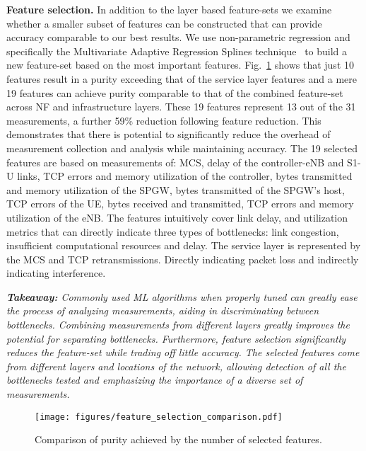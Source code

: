 \documentclass[journal,comsoc]{IEEEtran}
\begin{document}
% 
\textbf{Feature selection.}
In addition to the layer based feature-sets we examine whether a smaller subset of features can be constructed that can provide accuracy comparable to our best results.
We use non-parametric regression and specifically the Multivariate Adaptive Regression Splines technique~\cite{friedman1991multivariate} to build a new feature-set based on the most important features.
Fig.~\ref{fig:selection} shows that just 10 features result in a purity exceeding that of the service layer features and a mere 19 features can achieve purity comparable to that of the combined feature-set across NF and infrastructure layers.
These 19 features represent 13 out of the 31 measurements, a further 59\% reduction following feature reduction. 
This demonstrates that there is potential to significantly reduce the overhead of measurement collection and analysis while maintaining accuracy.
The 19 selected features are based on measurements of:
MCS,
delay of the controller-eNB and S1-U links,
TCP errors and memory utilization of the controller,
bytes transmitted and memory utilization of the SPGW,
bytes transmitted of the SPGW's host,
TCP errors of the UE,
bytes received and transmitted, TCP errors and memory utilization of the eNB.
The features intuitively cover link delay, and utilization metrics that can directly indicate three types of bottlenecks: link congestion, insufficient computational resources and delay.
The service layer is represented by the MCS and TCP retransmissions. Directly indicating packet loss and indirectly indicating interference.


% 
{\em \textbf{Takeaway:} Commonly used ML algorithms when properly tuned can greatly ease the process of analyzing measurements, aiding in discriminating between bottlenecks. Combining measurements from different layers greatly improves the potential for separating bottlenecks.  
Furthermore, feature selection significantly reduces the feature-set while trading off little accuracy.
The selected features come from different layers and locations of the network, allowing detection of all the bottlenecks tested and emphasizing the importance of a diverse set of measurements.}

% 
\begin{figure}[t]
	\centering
	\texttt{[image: figures/feature\_selection\_comparison.pdf]}
	\vspace{-8mm}
	\caption{Comparison of purity achieved by the number of selected features.}
	\label{fig:selection}
	\vspace{-4mm}
\end{figure}
\end{document}
